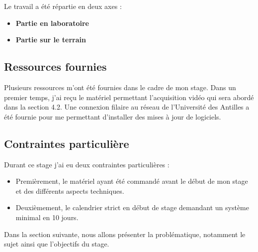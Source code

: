     \begin{flushleft}
        Le travail a été répartie en deux axes :
        \begin{itemize}
            \item  \textbf{Partie en laboratoire}
            \item  \textbf{Partie sur le terrain}
        \end{itemize}
        
        \vspace{0.5cm}      
    \end{flushleft}

    \subsection{Ressources fournies}
    Plusieurs ressources m'ont été fournies dans le cadre de mon stage.
    Dans un premier temps, j'ai reçu le matériel permettant l'acquisition vidéo qui sera abordé dans la section 4.2.
    Une connexion filaire au réseau de l'Université des Antilles a été fournie pour me permettant d'installer des mises à jour de logiciels.

    \subsection{Contraintes particulière}
    Durant ce stage j'ai eu deux contraintes particulières :
    \begin{itemize}
        \item Premièrement, le matériel ayant été commandé avant le début de mon stage et des différents aspects techniques.
        \item Deuxièmement, le calendrier strict en début de stage demandant un système minimal en 10 jours.
    \end{itemize}

    \vspace{0.5cm}

    Dans la section suivante, nous allons présenter la problématique, notamment le sujet ainsi que l'objectifs du stage.

